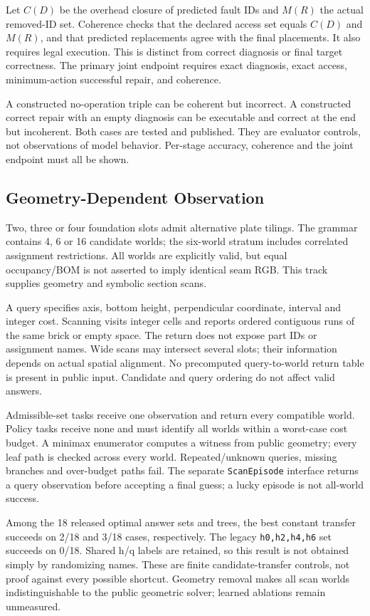 Let $C(D)$ be the overhead closure of predicted fault IDs and $M(R)$
the actual removed-ID set. Coherence checks that the declared access
set equals $C(D)$ and $M(R)$, and that predicted replacements agree
with the final placements. It also requires legal execution. This
is distinct from correct diagnosis or final target correctness.
The primary joint endpoint requires exact diagnosis, exact access,
minimum-action successful repair, and coherence.

A constructed no-operation triple can be coherent but incorrect.
A constructed correct repair with an empty diagnosis can be executable
and correct at the end but incoherent. Both cases are tested and
published. They are evaluator controls, not observations of model behavior.
Per-stage accuracy, coherence and the joint endpoint must all be shown.

\subsection{Geometry-Dependent Observation}
Two, three or four foundation slots admit alternative plate tilings.
The grammar contains 4, 6 or 16 candidate worlds; the six-world stratum
includes correlated assignment restrictions. All worlds are explicitly
valid, but equal occupancy/BOM is not asserted to imply identical seam
RGB. This track supplies geometry and symbolic section scans.

A query specifies axis, bottom height, perpendicular coordinate,
interval and integer cost. Scanning visits integer cells and reports
ordered contiguous runs of the same brick or empty space. The return
does not expose part IDs or assignment names. Wide scans may intersect
several slots; their information depends on actual spatial alignment.
No precomputed query-to-world return table is present in public input.
Candidate and query ordering do not affect valid answers.

Admissible-set tasks receive one observation and return every compatible
world. Policy tasks receive none and must identify all worlds within
a worst-case cost budget. A minimax enumerator computes a witness from
public geometry; every leaf path is checked across every world.
Repeated/unknown queries, missing branches and over-budget paths fail.
The separate \texttt{ScanEpisode} interface returns a query observation
before accepting a final guess; a lucky episode is not all-world success.

Among the 18 released optimal answer sets and trees, the best constant
transfer succeeds on 2/18 and 3/18 cases, respectively. The legacy
\texttt{h0,h2,h4,h6} set succeeds on 0/18. Shared h/q labels are retained,
so this result is not obtained simply by randomizing names.
These are finite candidate-transfer controls, not proof against every
possible shortcut. Geometry removal makes all scan worlds
indistinguishable to the public geometric solver; learned ablations
remain unmeasured.

